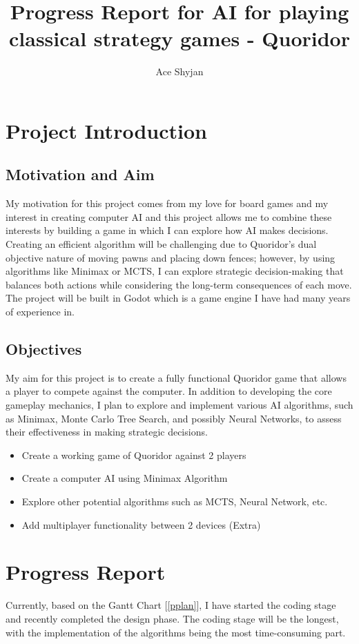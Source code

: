 \documentclass[progress]{cmpreport}
\title{Progress Report for AI for playing classical strategy games - Quoridor}
\author{Ace Shyjan}
\begin{document}
\section{Project Introduction}

\subsection{Motivation and Aim}
My motivation for this project comes from my love for board games and my interest in creating computer AI and this project allows me to combine these interests by building a game in which I can explore how AI makes decisions. Creating an efficient algorithm will be challenging due to Quoridor's dual objective nature of moving pawns and placing down fences; however, by using algorithms like Minimax or MCTS, I can explore strategic decision-making that balances both actions while considering the long-term consequences of each move. The project will be built in Godot which is a game engine I have had many years of experience in.

\subsection{Objectives}
My aim for this project is to create a fully functional Quoridor game that allows a player to compete against the computer. In addition to developing the core gameplay mechanics, I plan to explore and implement various AI algorithms, such as Minimax, Monte Carlo Tree Search, and possibly Neural Networks, to assess their effectiveness in making strategic decisions.
\begin{itemize}
    \item Create a working game of Quoridor against 2 players
    \item Create a computer AI using Minimax Algorithm
    \item Explore other potential algorithms such as MCTS, Neural Network, etc.
    \item Add multiplayer functionality between 2 devices (Extra)
\end{itemize}

\section{Progress Report}
Currently, based on the Gantt Chart [\ref{pplan}], I have started the coding stage and recently completed the design phase. The coding stage will be the longest, with the implementation of the algorithms being the most time-consuming part.
\end{document}
